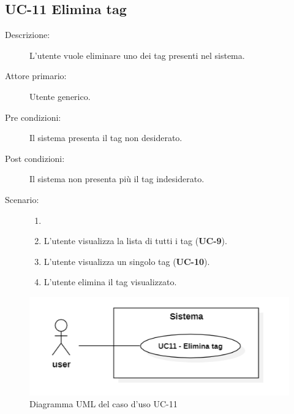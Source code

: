\subsection{UC-11 Elimina tag}
\begin{description}
    \item[Descrizione:] L'utente vuole eliminare uno dei tag presenti nel sistema.
    \item[Attore primario:] Utente generico.
    \item[Pre condizioni:] Il sistema presenta il tag non desiderato.
    \item[Post condizioni:] Il sistema non presenta più il tag indesiderato.
    \item[Scenario:]
    \begin{enumerate}
        \item[]
        \item L’utente visualizza la lista di tutti i tag (\textbf{UC-9}).
        \item L'utente visualizza un singolo tag (\textbf{UC-10}).
        \item L'utente elimina il tag visualizzato.
    \end{enumerate}
\end{description}

\begin{figure}[H]
    \centering
    \includegraphics[width=0.8\linewidth]{UC11.PNG} 
    \caption{Diagramma UML del caso d'uso UC-11}
    \label{fig:UC9}
\end{figure}

